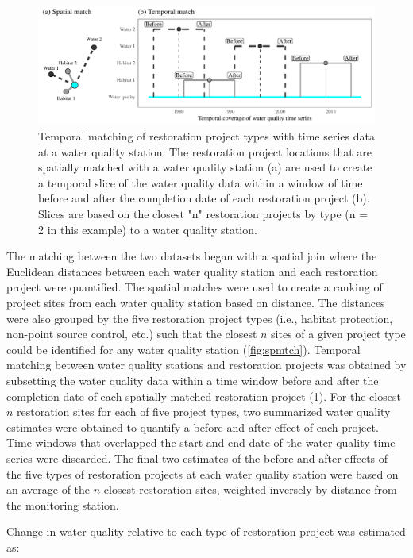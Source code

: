 \documentclass[]{article}
\begin{document}
\begin{figure}
\includegraphics[width=\textwidth]{figs/tmmtch-1} \caption{Temporal matching of restoration project types with time series data at a water quality station.  The restoration project locations that are spatially matched with a water quality station (a) are used to create a temporal slice of the water quality data within a window of time before and after the completion date of each restoration project (b).  Slices are based on the closest "n" restoration projects by type (n = 2 in this example) to a water quality station.}\label{fig:tmmtch}
\end{figure}

The matching between the two datasets began with a spatial join where
the Euclidean distances between each water quality station and each
restoration project were quantified. The spatial matches were used to
create a ranking of project sites from each water quality station based
on distance. The distances were also grouped by the five restoration
project types (i.e., habitat protection, non-point source control, etc.)
such that the closest \(n\) sites of a given project type could be
identified for any water quality station (\cref{fig:spmtch}). Temporal
matching between water quality stations and restoration projects was
obtained by subsetting the water quality data within a time window
before and after the completion date of each spatially-matched
restoration project (\cref{fig:tmmtch}). For the closest \(n\)
restoration sites for each of five project types, two summarized water
quality estimates were obtained to quantify a before and after effect of
each project. Time windows that overlapped the start and end date of the
water quality time series were discarded. The final two estimates of the
before and after effects of the five types of restoration projects at
each water quality station were based on an average of the \(n\) closest
restoration sites, weighted inversely by distance from the monitoring
station.

Change in water quality relative to each type of restoration project was
estimated as:
\end{document}
